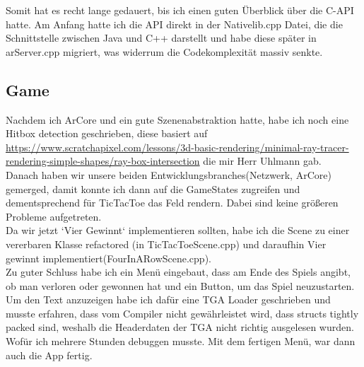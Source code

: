 Somit hat es recht lange gedauert, bis ich einen guten Überblick über die C-API
hatte. Am Anfang hatte ich die API direkt in der Nativelib.cpp Datei, die die
Schnittstelle zwischen Java und C++ darstellt und habe diese später in arServer.cpp
migriert, was widerrum die Codekomplexität massiv senkte.

\subsection{Game}
Nachdem ich ArCore und ein gute Szenenabstraktion hatte, habe ich noch eine Hitbox detection geschrieben, diese basiert auf \url{https://www.scratchapixel.com/lessons/3d-basic-rendering/minimal-ray-tracer-rendering-simple-shapes/ray-box-intersection}
die mir Herr Uhlmann gab.\\

Danach haben wir unsere beiden Entwicklungsbranches(Netzwerk, ArCore) gemerged, damit konnte ich
dann auf die GameStates zugreifen und dementsprechend für TicTacToe das Feld rendern.
Dabei sind keine größeren Probleme aufgetreten. \\

Da wir jetzt `Vier Gewinnt` implementieren sollten, habe ich die Scene zu einer vererbaren Klasse refactored (in TicTacToeScene.cpp) und daraufhin Vier gewinnt implementiert(FourInARowScene.cpp). \\

Zu guter Schluss habe ich ein Menü eingebaut, dass am Ende des Spiels angibt, ob man
verloren oder gewonnen hat und ein Button, um das Spiel neuzustarten.
Um den Text anzuzeigen habe ich dafür eine TGA Loader geschrieben und musste
erfahren, dass vom Compiler nicht gewährleistet wird, dass structs tightly packed
sind, weshalb die Headerdaten der TGA nicht richtig ausgelesen wurden. Wofür ich mehrere Stunden debuggen musste. Mit dem fertigen Menü, war dann auch die App fertig.
